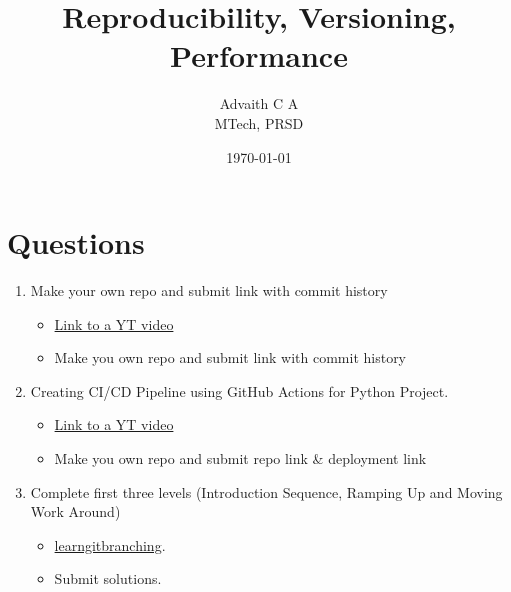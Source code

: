 \documentclass{article}
\title{Reproducibility, Versioning, Performance}
\author{Advaith C A \\MTech, PRSD}
\date{\today}
\begin{document}
    \maketitle
    \section*{Questions}
    \begin{enumerate}
        \item Make your own repo and submit link with commit history
        \begin{itemize}
            \item \href{https://www.youtube.com/watch?v=8Dd7KRpKeaE}{Link to a YT video}
            \item Make you own repo and submit link with commit history
        \end{itemize}
        \item Creating CI/CD Pipeline using GitHub Actions for Python Project.
        \begin{itemize}
            \item \href{https://www.youtube.com/watch?v=WTofttoD2xg}{Link to a YT video}
            \item Make you own repo and submit repo link \& deployment link
        \end{itemize}
        \item Complete first three levels (Introduction Sequence, Ramping Up and Moving Work Around)
        \begin{itemize}
            \item \href{https://learngitbranching.js.org/}{learngitbranching}.
            \item Submit solutions.
        \end{itemize}
    \end{enumerate}
\end{document}
